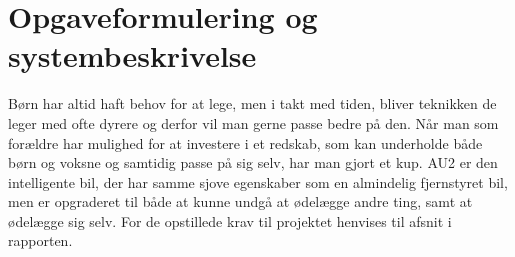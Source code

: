 \chapter{Opgaveformulering og systembeskrivelse} \label{ch:Systembeskrivelse} %

Børn har altid haft behov for at lege, men i takt med tiden, bliver teknikken de leger med ofte dyrere og derfor vil man gerne passe bedre på den. Når man som forældre har mulighed for at investere i et redskab, som kan underholde både børn og voksne og samtidig passe på sig selv, har man gjort et kup. AU2 er den intelligente bil, der har samme sjove egenskaber som en almindelig fjernstyret bil, men er opgraderet til både at kunne undgå at ødelægge andre ting, samt at ødelægge sig selv. For de opstillede krav til projektet henvises til afsnit  i rapporten.

